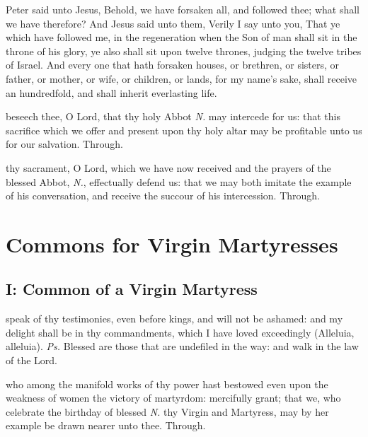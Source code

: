 \label{CommonAbbotsGospel}
 Peter said unto Jesus, Behold, we have forsaken all, and followed thee; what shall we have therefore? And Jesus said unto them, Verily I say unto you, That ye which have followed me, in the regeneration when the Son of man shall sit in the throne of his glory, ye also shall sit upon twelve thrones, judging the twelve tribes of Israel. And every one that hath forsaken houses, or brethren, or sisters, or father, or mother, or wife, or children, or lands, for my name's sake, shall receive an hundredfold, and shall inherit everlasting life.


\secret\label{CommonAbbotsSecret}
 beseech thee, O Lord, that thy holy Abbot \textit{N.} may intercede for us: that this sacrifice which we offer and present upon thy holy altar may be profitable unto us for our salvation. Through.


\postcommunion\label{CommonAbbotsPostcommunion}
 thy sacrament, O Lord, which we have now received and the prayers of the blessed Abbot, \textit{N.}, effectually defend us: that we may both imitate the example of his conversation, and receive the succour of his intercession. Through.


\section{Commons for Virgin Martyresses}

\subsection{I: Common of a Virgin Martyress}\label{CommonVirginMartyrI}

\introit
{} speak of thy testimonies, even before kings, and will not be ashamed: and my delight shall be in thy commandments, which I have loved exceedingly (Alleluia, alleluia). \textit{Ps.} Blessed are those that are undefiled in the way: and walk in the law of the Lord.

\collect
{} who among the manifold works of thy power hast bestowed even upon the weakness of women the victory of martyrdom: mercifully grant; that we, who celebrate the birthday of blessed \textit{N.} thy Virgin and Martyress, may by her example be drawn nearer unto thee. Through.

